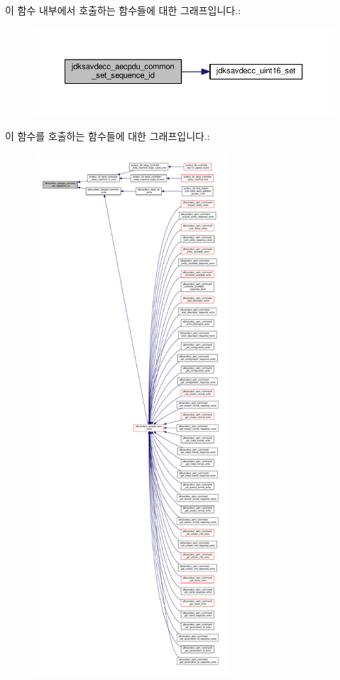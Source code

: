 이 함수 내부에서 호출하는 함수들에 대한 그래프입니다.\+:
\nopagebreak
\begin{figure}[H]
\begin{center}
\leavevmode
\includegraphics[width=350pt]{group__aecpdu__common_gab9f7895d1c5befd0b2965510dfe66533_cgraph}
\end{center}
\end{figure}




이 함수를 호출하는 함수들에 대한 그래프입니다.\+:
\nopagebreak
\begin{figure}[H]
\begin{center}
\leavevmode
\includegraphics[height=550pt]{group__aecpdu__common_gab9f7895d1c5befd0b2965510dfe66533_icgraph}
\end{center}
\end{figure}


